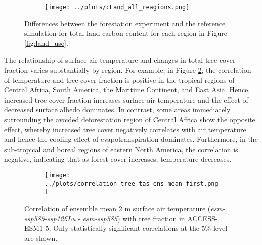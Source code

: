 \documentclass[]{article}
\begin{document}
\begin{figure}[H]
    \centering
    \begin{subfigure}[b]{\linewidth}
        \texttt{[image: ../plots/cLand\_all\_reagions.png]}
    \end{subfigure}

    \caption{Differences between the forestation experiment and the reference simulation for total land carbon content for each region in Figure \ref{fig:land_use}.}
    \label{fig:accesss_regional_cland}
\end{figure}

The relationship of surface air temperature and changes in total tree cover fraction varies substantially by region.
For example, in Figure \ref{fig:map_tas_tree_correlation}, the correlation of temperature and tree cover fraction is positive in the tropical regions of Central Africa, South America, the Maritime Continent, and East Asia.
Hence, increased tree cover fraction increases surface air temperature and the effect of decreased surface albedo dominates.
In contrast, some areas immediately surrounding the avoided deforestation region of Central Africa show the opposite effect, whereby increased tree cover negatively correlates with air temperature and hence the cooling effect of evapotranspiration dominates.
Furthermore, in the sub-tropical and boreal regions of eastern North America, the correlation is negative, indicating that as forest cover increases, temperature decreases.

\begin{figure}[H]
    \centering
    \begin{subfigure}[b]{0.7\linewidth}
        \texttt{[image: ../plots/correlation\_tree\_tas\_ens\_mean\_first.png]}
    \end{subfigure}
    \caption{Correlation of ensemble mean 2 m surface air temperature (\textit{esm-ssp585-ssp126Lu} - \textit{esm-ssp585}) with tree fraction in ACCESS-ESM1-5. Only statistically significant correlations at the 5\% level are shown.}
    \label{fig:map_tas_tree_correlation}
\end{figure}
\end{document}

